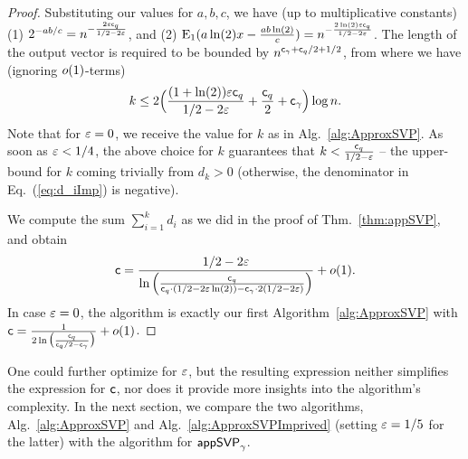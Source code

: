 \begin{proof}
	Substituting our values for $a, b, c$, we have (up to multiplicative constants) (1) $2^{-ab/c} = n^{-\frac{2 \varepsilon \mathsf{c}_q}{1/2 - 2\varepsilon}}$, and (2) $\text{E}_1 (a \ln(2)x - \frac{ab\ln(2)}{c}) = n^{-\frac{2 \ln(2) \varepsilon \mathsf{c}_q}{1/2 - 2\varepsilon}}$. The length of the output vector is required to be bounded by $n^{\mathsf{c}_{\gamma}+\mathsf{c}_q/2 + 1/2}$, from where we have (ignoring $o(1)$-terms)
	\[
		k \leq 2 \Big( \frac{(1+\ln(2))\varepsilon \mathsf{c}_q}{1/2 - 2\varepsilon} + \frac{\mathsf{c}_q}{2} + \mathsf{c}_{\gamma} \Big) \log n.
	\]    
	Note that for $\varepsilon=0$, we receive the value for $k$ as in Alg.~\ref{alg:ApproxSVP}. As soon as $\varepsilon<1/4$, the above choice for $k$ guarantees that $k < \frac{\mathsf{c}_q}{1/2-\varepsilon}$ -- the upper-bound for $k$ coming trivially from $d_k>0$ (otherwise, the denominator in Eq.~(\ref{eq:d_iImp}) is negative).
	
	We compute the sum $\sum_{i=1}^k d_i$ as we did in the proof of Thm.~\ref{thm:appSVP}, and obtain
	\[
		\mathsf{c} = \frac{1/2 - 2\varepsilon}{\ln \left( \frac{\mathsf{c}_q}{ \mathsf{c}_q \cdot  (1/2 -2\varepsilon \ln(2)) -  \mathsf{c}_{\gamma} \cdot 2(1/2-2\varepsilon)} \right)} + o(1).
	\]   
	In case $\varepsilon=0$, the algorithm is exactly our first Algorithm~\ref{alg:ApproxSVP} with $\mathsf{c} = \frac{1}{2 \ln \big( \frac{\mathsf{c}_q}{\mathsf{c}_q/2-\mathsf{c}_{\gamma}} \big)} +o(1)$.  
\end{proof}

One could further optimize for $\varepsilon$, but the resulting expression neither simplifies the expression for $\mathsf{c}$, nor does it provide more insights into the algorithm's complexity. In the next section, we compare the two algorithms, Alg.~\ref{alg:ApproxSVP} and Alg.~\ref{alg:ApproxSVPImprived} (setting $\varepsilon = 1/5$ for the latter) with the \BKZ algorithm for $\textsf{appSVP}_{\gamma}$.